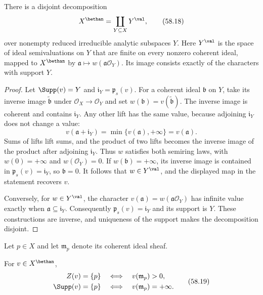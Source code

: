 \begin{proposition}\label{prop:ts-support-stratification}
There is a disjoint decomposition
\[
                X^\bethan
                =\coprod_{Y\subseteq X}Y^{\val},
\tag{58.18}\label{eq:ts-support-strata}
\]
over nonempty reduced irreducible analytic subspaces $Y$.
Here $Y^{\val}$ is the space of ideal semivaluations on $Y$
that are finite on every nonzero coherent ideal, mapped to
$X^\bethan$ by $\mathfrak a\mapsto w(\mathfrak a\mathcal O_Y)$.
Its image consists exactly of the characters with support $Y$.
\end{proposition}

\begin{proof}
Let $\Supp(v)=Y$ and $\mathfrak i_Y=\mathfrak p_s(v)$.
For a coherent ideal $\mathfrak b$ on $Y$, take its inverse
image $\widetilde{\mathfrak b}$ under
$\mathcal O_X\to\mathcal O_Y$ and set
$w(\mathfrak b)=v(\widetilde{\mathfrak b})$.
The inverse image is coherent and contains $\mathfrak i_Y$.
Any other lift has the same value, because adjoining
$\mathfrak i_Y$ does not change a value:
\[
 v(\mathfrak a+\mathfrak i_Y)
       =\min\{v(\mathfrak a),+\infty\}=v(\mathfrak a).
\]
Sums of lifts lift sums, and the product of two lifts becomes
the inverse image of the product after adjoining $\mathfrak i_Y$.
Thus $w$ satisfies both semiring laws, with $w(0)=+\infty$
and $w(\mathcal O_Y)=0$.
If $w(\mathfrak b)=+\infty$, its inverse image is contained
in $\mathfrak p_s(v)=\mathfrak i_Y$, so $\mathfrak b=0$.
It follows that $w\in Y^{\val}$, and the displayed map in the
statement recovers $v$.

Conversely, for $w\in Y^{\val}$, the character
$v(\mathfrak a)=w(\mathfrak a\mathcal O_Y)$ has infinite value
exactly when $\mathfrak a\subseteq\mathfrak i_Y$.
Consequently $\mathfrak p_s(v)=\mathfrak i_Y$ and its support
is $Y$. These constructions are inverse, and uniqueness of the
support makes the decomposition disjoint.
\end{proof}

Let $p\in X$ and let $\mathfrak m_p$ denote its coherent ideal sheaf.

\begin{proposition}\label{prop:ts-point-criteria}
For $v\in X^\bethan$,
\[
\begin{aligned}
 Z(v)=\{p\}
       &\quad\Longleftrightarrow\quad v(\mathfrak m_p)>0,\\
 \Supp(v)=\{p\}
       &\quad\Longleftrightarrow\quad v(\mathfrak m_p)=+\infty.
\end{aligned}
\tag{58.19}\label{eq:ts-point-criteria}
\]
\end{proposition}

